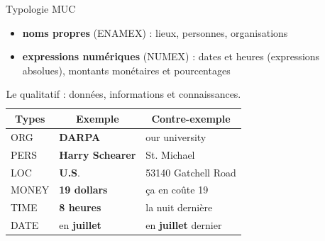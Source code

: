\documentclass[xetex,xcolor={table,usenames,dvipsnames}]{beamer}
\begin{document}
\begin{frame}{Typologie \textsc{MUC}}
	\begin{itemize}
		\item \textcolor{deepblue}{\textbf{noms propres}} (\textsc{ENAMEX}) : lieux, personnes, organisations
		\item \textcolor{deepblue}{\textbf{expressions numériques}} (\textsc{NUMEX}) : dates et heures (expressions absolues), montants monétaires et pourcentages
	\end{itemize}
	
	\begin{table}[h]
		\centering
		\scriptsize
		\begin{tabularx}{\textwidth}{|X|X|X|}
			\hline
			\multicolumn{1}{|c}{Types} & \multicolumn{1}{|c|}{Exemple} & \multicolumn{1}{c|}{Contre-exemple} \\ \hline		
			\textsc{ORG} &  \textbf{DARPA} & our university\\
			\textsc{PERS}& \textbf{Harry Schearer} & St. Michael \\
			\textsc{LOC} & \textbf{\textsc{U.S}}. & 53140 Gatchell Road\\
			\hline
			\textsc{MONEY}& \textbf{19 dollars} & ça en coûte 19 \\
			\textsc{TIME} & \textbf{8 heures} & la nuit dernière \\
			\textsc{DATE} & en \textbf{juillet} & en \textbf{juillet} dernier\\
			\hline
		\end{tabularx}
		\caption{Le qualitatif : données, informations et connaissances.}
	\end{table}
	
\end{frame}
\end{document}

